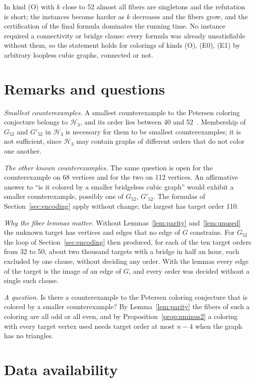 \documentclass[11pt]{article}
\theoremstyle{definition}
\theoremstyle{remark}
\newcommand{\Hthree}{\mathcal{H}_3}
\newcommand{\Ga}{G_{52}}
\newcommand{\Gb}{G'_{52}}
\begin{document}
In kind (O) with $k$ close to 52 almost all fibers are singletons and the refutation is short; the
instances become harder as $k$ decreases and the fibers grow, and the certification of the final
formula dominates the running time. No instance required a connectivity or bridge clause: every
formula was already unsatisfiable without them, so the statement holds for colorings of kinds (O),
(E0), (E1) by arbitrary loopless cubic graphs, connected or not.

\section{Remarks and questions}\label{sec:remarks}

\emph{Smallest counterexamples.} A smallest counterexample to the Petersen coloring conjecture
belongs to $\Hthree$, and its order lies between 40 and 52~\cite{GJMMMU2026}. Membership of $\Ga$
and $\Gb$ in $\Hthree$ is necessary for them to be smallest counterexamples; it is not sufficient,
since $\Hthree$ may contain graphs of different orders that do not color one another.

\emph{The other known counterexamples.} The same question is open for the counterexample on 68
vertices and for the two on 112 vertices. An affirmative answer to ``is it colored by a smaller
bridgeless cubic graph'' would exhibit a smaller counterexample, possibly one of $\Ga$, $\Gb$. The
formulas of Section~\ref{sec:encoding} apply without change; the largest has target order 110.

\emph{Why the fiber lemmas matter.} Without Lemmas~\ref{lem:parity} and~\ref{lem:unused} the
unknown target has vertices and edges that no edge of $G$ constrains. For $\Ga$ the loop of
Section~\ref{sec:encoding} then produced, for each of the ten target orders from 32 to 50, about
two thousand targets with a bridge in half an hour, each excluded by one clause, without deciding
any order. With the lemmas every edge of the target is the image of an edge of $G$, and every
order was decided without a single such clause.

\emph{A question.} Is there a counterexample to the Petersen coloring conjecture that is colored
by a smaller counterexample? By Lemma~\ref{lem:parity} the fibers of such a coloring are all odd
or all even, and by Proposition~\ref{prop:nminus2} a coloring with every target vertex used needs
target order at most $n - 4$ when the graph has no triangles.

\section*{Data availability}
\end{document}

